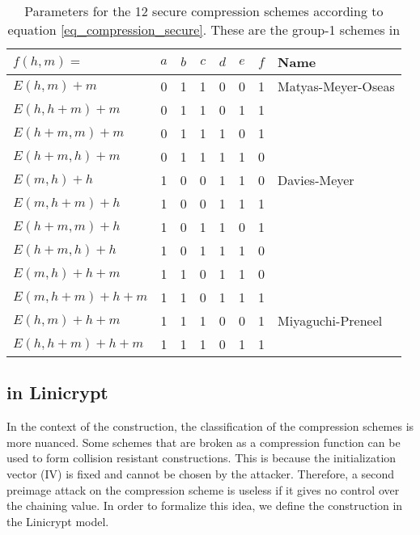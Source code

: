 \begin{table}[]
\centering
\renewcommand{\arraystretch}{1.2}
\begin{tabular}{l|cccccc|l}
\toprule
    $f(h,m)=$  & $a$ & $b$ & $c$ & $d$ & $e$ & $f$ & Name \\
    \midrule
    $E(h,m)   +m$    & 0 & 1 & 1 & 0 & 0 & 1 & Matyas-Meyer-Oseas \\
    $E(h,h+m) +m$    & 0 & 1 & 1 & 0 & 1 & 1 &  \\
    $E(h+m,m) +m$    & 0 & 1 & 1 & 1 & 0 & 1 &  \\
    $E(h+m,h) +m$    & 0 & 1 & 1 & 1 & 1 & 0 &  \\
    $E(m,h)   +h$    & 1 & 0 & 0 & 1 & 1 & 0 & Davies-Meyer \\
    $E(m,h+m) +h$    & 1 & 0 & 0 & 1 & 1 & 1 &  \\
    $E(h+m,m) +h$    & 1 & 0 & 1 & 1 & 0 & 1 &  \\
    $E(h+m,h) +h$    & 1 & 0 & 1 & 1 & 1 & 0 &  \\
    $E(m,h)   +h+m$  & 1 & 1 & 0 & 1 & 1 & 0 &  \\
    $E(m,h+m) +h+m$  & 1 & 1 & 0 & 1 & 1 & 1 &  \\
    $E(h,m)   +h+m$  & 1 & 1 & 1 & 0 & 0 & 1 & Miyaguchi-Preneel \\
    $E(h,h+m) +h+m$  & 1 & 1 & 1 & 0 & 1 & 1 &  \\
\hline
\bottomrule
\end{tabular}
\caption{Parameters for the 12 secure compression schemes according to equation \eqref{eq_compression_secure}.
    These are the group-1 schemes in \cite{C:BlaRogShr02}}
\label{table_12_secure_compression_schemes}
\end{table}

\subsection{\MD in Linicrypt}

In the context of the \MD construction, the classification of the compression schemes is more nuanced.
Some schemes that are broken as a compression function can be used to form collision resistant \MD constructions.
This is because the initialization vector (IV) is fixed and cannot be chosen by the attacker.
Therefore, a second preimage attack on the compression scheme is useless if it gives no control over the chaining value.
In order to formalize this idea, we define the \MD construction in the Linicrypt model.

